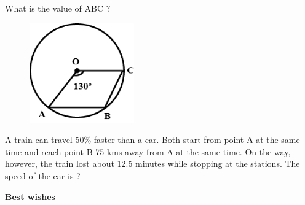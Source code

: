 \documentclass[12pt, a4paper]{exam}
\begin{document}
\begin{questions}
	\pointsdroppedatright
%

	\question
	What is the value of  \angle ABC ?
	\begin{figure}[h!]
	\centering
	\includegraphics[width=0.4\textwidth]{figs/2.png}
	\end{figure}

	\question
 A train can travel 50\% faster than a car. Both start from point A at the same time and reach point B 75 kms away from A at the same time. On the way, however, the train lost about 12.5 minutes while stopping at the stations. The speed of the car is ?
	
\end{questions}
\vspace{0.75in}
{\large \bfseries Best wishes}
\end{document}
